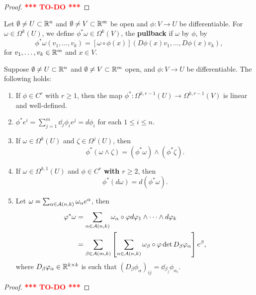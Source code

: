 \documentclass[a4paper]{article}
\newcommand{\TODO}{\textcolor{red}{\textbf{*** TO-DO ***}}}
\begin{document}
\begin{proof}
\TODO
\end{proof}

\begin{defi}[pullback]
Let $\emptyset \neq U \subset \mathbb{R}^n$ and $\emptyset \neq V 
\subset \mathbb{R}^m$ be open and $\phi : V \to U$ be differentiable.
For $\omega \in \Omega^k(U)$, we define $\phi^* \omega \in 
\Omega^k(V)$, the \textbf{pullback} if $\omega$ by $\phi$, 
by 
\[
\phi^* \omega (v_1, \dots, v_k) = 
[\omega \circ \phi(x)] (D \phi(x) v_1, \dots, D \phi(x) v_k),
\]
for $v_1, \dots, v_k \in \mathbb{R}^m$ and $x \in V$.
\end{defi}

\begin{thm}
Suppose $\emptyset \neq U \subset \mathbb{R}^n$ and 
$\emptyset \neq V \subset \mathbb{R}^m$ open, and
$\phi : V \to U$ be differentiable. 
The following holds: 
\begin{enumerate}
\item If $\phi \in C^r$ with $r \geq 1$, 
then the map $\phi^* : \Omega^{k, r-1}(U) 
\to \Omega^{k, r-1}(V)$ is linear and well-defined.

\item $\phi^* e^i = \sum_{j=1}^m \dd_j \phi_i e^j = d \phi_i$
for each $1 \leq i \leq n$.

\item If $\omega \in \Omega^k(U)$ and $\zeta \in \Omega^j(U)$, 
then 
\[
\phi^* (\omega \wedge \zeta) = (\phi^* \omega) \wedge 
(\phi^* \zeta).
\]

\item If $\omega \in \Omega^{k, 1} (U)$ and $\phi \in C^r$ 
\textbf{with $r \geq 2$}, then 
\[
\phi^* (d \omega) = d (\phi^* \omega).
\]

\item Let $\omega = \sum_{\alpha \in \mathcal{A}(n, k)} 
\omega_\alpha e^\alpha$, then 
\[
\begin{aligned}
\varphi^* \omega
&= \sum_{\alpha \in \mathcal{A}(n, k)} \omega_\alpha \circ \varphi 
d \varphi_1 \wedge \dots \wedge d \varphi_k \\
&= \sum_{\beta \in \mathcal{A}(m, k)} 
\left[ \sum_{\alpha \in \mathcal{A}(n, k)} \omega_\beta \circ \varphi 
\det D_\beta \varphi_\alpha \right] e^\beta,
\end{aligned}
\]
where $D_\beta \varphi_\alpha \in \mathbb{R}^{k \times k}$ is such that 
$(D_\beta \phi_\alpha)_{ij} = \dd_{\beta_j} \phi_{\alpha_i}$.
\end{enumerate}
\end{thm}

\begin{proof}
\TODO
\end{proof}
\end{document}
